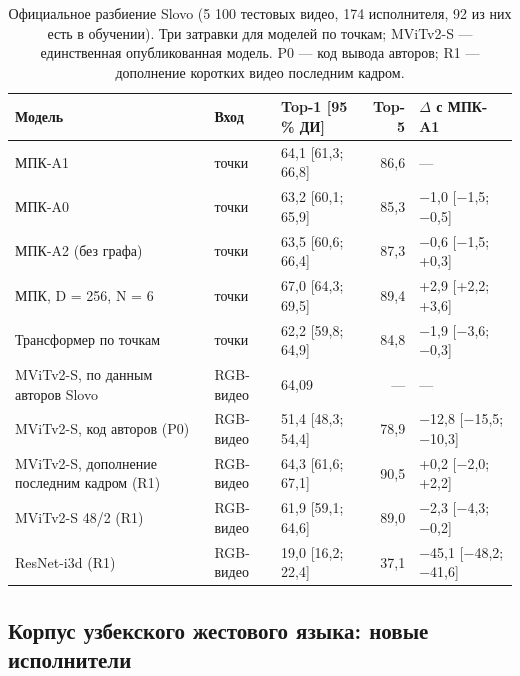 \begin{table}[t]
\caption{Официальное разбиение Slovo (5 100 тестовых видео, 174 исполнителя, 92 из них есть в обучении). Три затравки для моделей по точкам; MViTv2-S — единственная опубликованная модель. P0 — код вывода авторов; R1 — дополнение коротких видео последним кадром.}\label{tab:official}
\footnotesize
\centering
\begin{tabular}{lllrl}
\toprule
\textbf{Модель} & \textbf{Вход} & \textbf{Top-1 [95 \% ДИ]} & \textbf{Top-5} & \textbf{$\Delta$ с МПК-A1} \\
\midrule
МПК-A1 & точки & 64,1 [61,3; 66,8] & 86,6 & --- \\
МПК-A0 & точки & 63,2 [60,1; 65,9] & 85,3 & −1,0 [−1,5; −0,5] \\
МПК-A2 (без графа) & точки & 63,5 [60,6; 66,4] & 87,3 & −0,6 [−1,5; +0,3] \\
МПК, D = 256, N = 6 & точки & 67,0 [64,3; 69,5] & 89,4 & +2,9 [+2,2; +3,6] \\
Трансформер по точкам & точки & 62,2 [59,8; 64,9] & 84,8 & −1,9 [−3,6; −0,3] \\
MViTv2-S, по данным авторов Slovo & RGB-видео & 64,09 & --- & --- \\
MViTv2-S, код авторов (P0) & RGB-видео & 51,4 [48,3; 54,4] & 78,9 & −12,8 [−15,5; −10,3] \\
MViTv2-S, дополнение последним кадром (R1) & RGB-видео & 64,3 [61,6; 67,1] & 90,5 & +0,2 [−2,0; +2,2] \\
MViTv2-S 48/2 (R1) & RGB-видео & 61,9 [59,1; 64,6] & 89,0 & −2,3 [−4,3; −0,2] \\
ResNet-i3d (R1) & RGB-видео & 19,0 [16,2; 22,4] & 37,1 & −45,1 [−48,2; −41,6] \\
\bottomrule
\end{tabular}
\end{table}

\hypertarget{ux43aux43eux440ux43fux443ux441-ux443ux437ux431ux435ux43aux441ux43aux43eux433ux43e-ux436ux435ux441ux442ux43eux432ux43eux433ux43e-ux44fux437ux44bux43aux430-ux43dux43eux432ux44bux435-ux438ux441ux43fux43eux43bux43dux438ux442ux435ux43bux438}{%
\subsection{Корпус узбекского жестового языка: новые исполнители}\label{ux43aux43eux440ux43fux443ux441-ux443ux437ux431ux435ux43aux441ux43aux43eux433ux43e-ux436ux435ux441ux442ux43eux432ux43eux433ux43e-ux44fux437ux44bux43aux430-ux43dux43eux432ux44bux435-ux438ux441ux43fux43eux43bux43dux438ux442ux435ux43bux438}}

